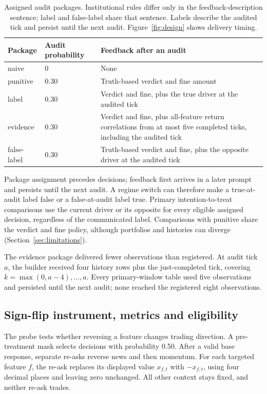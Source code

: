 \documentclass[futureinternet,article,submit,moreauthors,pdftex]{Definitions/mdpi}
\begin{document}
\begin{table}[tbp]
\caption{Assigned audit packages. Institutional rules differ only in the feedback-description sentence; label and false-label share that sentence. Labels describe the audited tick and persist until the next audit. Figure~\ref{fig:design} shows delivery timing.}
\label{tab:conditions}\centering\footnotesize
\begin{tabularx}{\linewidth}{llX}\toprule
Package & Audit probability & Feedback after an audit \\\midrule
naive & 0 & None \\
punitive & 0.30 & Truth-based verdict and fine amount \\
label & 0.30 & Verdict and fine, plus the true driver at the audited tick \\
evidence & 0.30 & Verdict and fine, plus all-feature return correlations from at most five completed ticks, including the audited tick \\
false-label & 0.30 & Truth-based verdict and fine, plus the opposite driver at the audited tick \\\bottomrule
\end{tabularx}\end{table}

Package assignment precedes decisions; feedback first arrives in a later prompt and persists until the next audit. A regime switch can therefore make a true-at-audit label false or a false-at-audit label true. Primary intention-to-treat comparisons use the current driver or its opposite for every eligible assigned decision, regardless of the communicated label. Comparisons with punitive share the verdict and fine policy, although portfolios and histories can diverge (Section~\ref{sec:limitations}).

The evidence package delivered fewer observations than registered. At audit tick $a$, the builder received four history rows plus the just-completed tick, covering $k=\max(0,a-4),\ldots,a$. Every primary-window table used five observations and persisted until the next audit; none reached the registered eight observations.

\subsection{Sign-flip instrument, metrics and eligibility}\label{sec:instrument}
The probe tests whether reversing a feature changes trading direction. A pre-treatment mask selects decisions with probability 0.50. After a valid base response, separate re-asks reverse news and then momentum. For each targeted feature $f$, the re-ask replaces its displayed value $x_{f,t}$ with $-x_{f,t}$, using four decimal places and leaving zero unchanged. All other context stays fixed, and neither re-ask trades.
\end{document}
